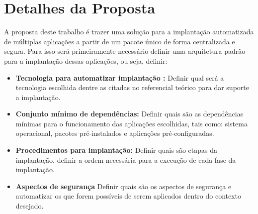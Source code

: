 %
%
%
%
%
%

\section{Detalhes da Proposta}

A proposta deste trabalho é trazer uma solução para a implantação automatizada
de múltiplas aplicações a partir de um pacote único de forma centralizada e segura.
Para isso será primeiramente necessário definir uma arquitetura padrão para a
implantação dessas aplicações, ou seja, definir:

\begin{itemize}
  \item  \textbf{Tecnologia para automatizar implantação :}  Definir qual será a
  tecnologia escolhida dentre as citadas no referencial teórico para dar suporte
  a implantação.
  \item  \textbf{Conjunto mínimo de dependências:} Definir quais são as dependências
  mínimas para o funcionamento das aplicações escolhidas, tais como: sistema operacional,
  pacotes pré-instalados e aplicações pré-configuradas.
  \item  \textbf{Procedimentos para implantação:} Definir quais são etapas da implantação,
  definir a ordem necessária para a execução de cada fase da implantação.
  \item  \textbf{Aspectos de segurança} Definir quais são os aspectos de segurança
  e automatizar os que forem possíveis de serem aplicados dentro do contexto desejado.
\end{itemize}

